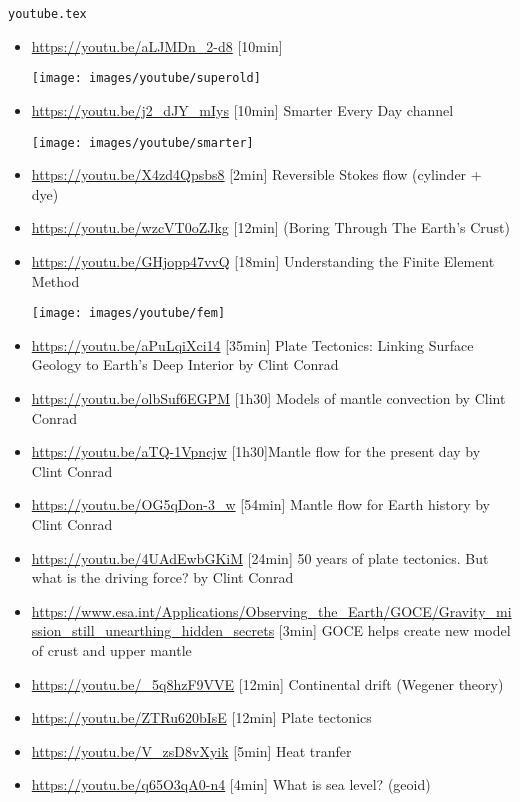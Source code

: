 \begin{flushright} {\tiny {\color{gray} \tt youtube.tex}} \end{flushright}

\begin{itemize}
\item \url{https://youtu.be/aLJMDn_2-d8} [10min]
\begin{center}
\texttt{[image: images/youtube/superold]}\\
\end{center}

\item \url{https://youtu.be/j2_dJY_mIys} [10min] Smarter Every Day channel
\begin{center}
\texttt{[image: images/youtube/smarter]}\\
\end{center}

\item \url{https://youtu.be/X4zd4Qpsbs8} [2min] Reversible Stokes flow (cylinder + dye)
\item \url{https://youtu.be/wzcVT0oZJkg} [12min] (Boring Through The Earth's Crust)
\item \url{https://youtu.be/GHjopp47vvQ} [18min] Understanding the Finite Element Method
\begin{center}
\texttt{[image: images/youtube/fem]}\\
\end{center}
\item \url{https://youtu.be/aPuLqiXci14} [35min] Plate Tectonics: Linking Surface Geology to Earth’s Deep Interior by Clint Conrad 
\item \url{https://youtu.be/olbSuf6EGPM} [1h30] Models of mantle convection by Clint Conrad 
\item \url{https://youtu.be/aTQ-1Vpncjw} [1h30]Mantle flow for the present day by Clint Conrad 
\item \url{https://youtu.be/OG5qDon-3_w} [54min] Mantle flow for Earth history by Clint Conrad 
\item \url{https://youtu.be/4UAdEwbGKiM} [24min] 50 years of plate tectonics. But what is the driving force? by Clint Conrad
\item \url{https://www.esa.int/Applications/Observing_the_Earth/GOCE/Gravity_mission_still_unearthing_hidden_secrets} [3min] GOCE helps create new model of crust and upper mantle

\item \url{https://youtu.be/_5q8hzF9VVE} [12min] Continental drift (Wegener theory) 
\item \url{https://youtu.be/ZTRu620bIsE} [12min] Plate tectonics
\item \url{https://youtu.be/V_zsD8vXyik} [5min] Heat tranfer 
\item \url{https://youtu.be/q65O3qA0-n4} [4min] What is sea level? (geoid) 

\end{itemize}



